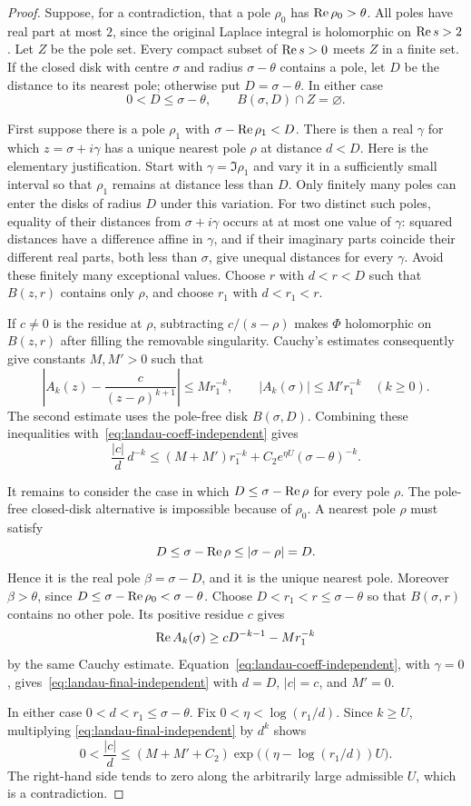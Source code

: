 \begin{proof}
Suppose, for a contradiction, that a pole $\rho_0$ has
$\operatorname{Re}\rho_0>\theta$. All poles have real part at most $2$, since the
original Laplace integral is holomorphic on $\operatorname{Re} s>2$.
Let $Z$ be the pole set. Every compact subset of $\operatorname{Re} s>0$ meets $Z$
in a finite set. If the closed disk with centre $\sigma$ and radius
$\sigma-\theta$ contains a pole, let $D$ be the distance to its nearest
pole; otherwise put $D=\sigma-\theta$. In either case
\[
 0<D\le\sigma-\theta,
 \qquad B(\sigma,D)\cap Z=\varnothing.
\]

First suppose there is a pole $\rho_1$ with
$\sigma-\operatorname{Re}\rho_1<D$. There is then a real $\gamma$ for which
$z=\sigma+i\gamma$ has a unique nearest pole $\rho$ at distance $d<D$.
Here is the elementary justification. Start with
$\gamma=\Im\rho_1$ and vary it in a sufficiently small interval so
that $\rho_1$ remains at distance less than $D$. Only finitely many
poles can enter the disks of radius $D$ under this variation. For two
distinct such poles, equality of their distances from
$\sigma+i\gamma$ occurs at at most one value of $\gamma$: squared
distances have a difference affine in $\gamma$, and if their imaginary
parts coincide their different real parts, both less than $\sigma$,
give unequal distances for every $\gamma$. Avoid these finitely many
exceptional values. Choose $r$ with $d<r<D$ such that $B(z,r)$ contains
only $\rho$, and choose $r_1$ with $d<r_1<r$.

If $c\ne0$ is the residue at $\rho$, subtracting $c/(s-\rho)$ makes
$\Phi$ holomorphic on $B(z,r)$ after filling the removable singularity.
Cauchy's estimates consequently give constants $M,M'>0$ such that
\[
 \left|A_k(z)-\frac{c}{(z-\rho)^{k+1}}\right|\le Mr_1^{-k},
 \qquad |A_k(\sigma)|\le M'r_1^{-k}
 \quad(k\ge0).
\]
The second estimate uses the pole-free disk $B(\sigma,D)$.
Combining these inequalities with~\eqref{eq:landau-coeff-independent}
gives
\begin{equation}\label{eq:landau-final-independent}
 \frac{|c|}{d}\,d^{-k}
 \le (M+M')r_1^{-k}
       +C_2e^{\eta U}(\sigma-\theta)^{-k}.
\end{equation}

It remains to consider the case in which
$D\le\sigma-\operatorname{Re}\rho$ for every pole $\rho$.
The pole-free closed-disk alternative is impossible because of
$\rho_0$. A nearest pole $\rho$ must satisfy
\[
 D\le\sigma-\operatorname{Re}\rho\le|\sigma-\rho|=D.
\]
Hence it is the real pole $\beta=\sigma-D$, and it is the unique nearest
pole. Moreover $\beta>\theta$, since
$D\le\sigma-\operatorname{Re}\rho_0<\sigma-\theta$.
Choose $D<r_1<r\le\sigma-\theta$ so that $B(\sigma,r)$ contains no
other pole. Its positive residue $c$ gives
\[
 \operatorname{Re} A_k(\sigma)\ge cD^{-k-1}-Mr_1^{-k}
\]
by the same Cauchy estimate. Equation~\eqref{eq:landau-coeff-independent},
with $\gamma=0$, gives~\eqref{eq:landau-final-independent} with
$d=D$, $|c|=c$, and $M'=0$.

In either case $0<d<r_1\le\sigma-\theta$. Fix
$0<\eta<\log(r_1/d)$. Since $k\ge U$, multiplying
\eqref{eq:landau-final-independent} by $d^k$ shows
\[
 0<\frac{|c|}{d}
 \le (M+M'+C_2)
      \exp\bigl((\eta-\log(r_1/d))U\bigr).
\]
The right-hand side tends to zero along the arbitrarily large admissible
$U$, which is a contradiction.
\end{proof}



